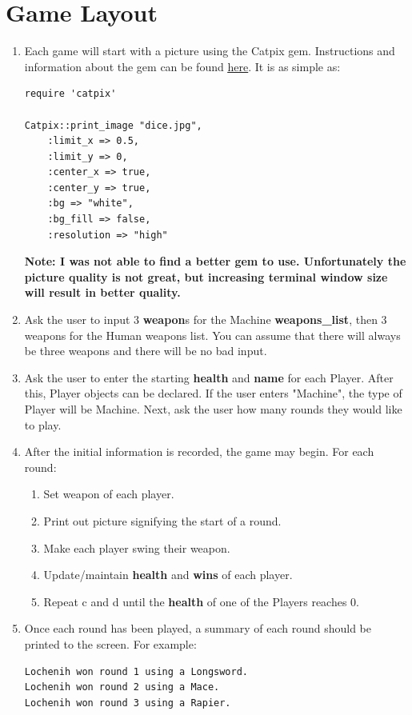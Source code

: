 \documentclass{article}
\begin{document}
\section*{Game Layout}
\begin{enumerate}

\item Each game will start with a picture using the Catpix gem. Instructions and information about the gem can be found \href{https://github.com/pazdera/catpix}{\underline{here}}. It is as simple as: \\
\begin{lstlisting}
require 'catpix'

Catpix::print_image "dice.jpg", 
	:limit_x => 0.5,
	:limit_y => 0,
	:center_x => true,
	:center_y => true,
	:bg => "white",
	:bg_fill => false,
	:resolution => "high"
\end{lstlisting}
\textbf{Note: I was not able to find a better gem to use. Unfortunately the picture quality is not great, but increasing terminal window size will result in better quality.}

\item Ask the user to input 3 \textbf{weapon}s for the Machine \textbf{weapons\_list}, then 3 weapons for the Human weapons list. You can assume that there will always be three weapons and there will be no bad input.

\item Ask the user to enter the starting \textbf{health} and \textbf{name} for each Player. After this, Player objects can be declared. If the user enters "Machine", the type of Player will be Machine. Next, ask the user how many rounds they would like to play.

\item After the initial information is recorded, the game may begin. For each round: \\
\newpage
\begin{enumerate}
\item Set weapon of each player.
\item Print out picture signifying the start of a round.
\item Make each player swing their weapon.
\item Update/maintain \textbf{health} and \textbf{wins} of each player.
\item Repeat c and d until the \textbf{health} of one of the Players reaches 0.
\end{enumerate}

\item Once each round has been played, a summary of each round should be printed to the screen. For example: \\
\begin{lstlisting}
Lochenih won round 1 using a Longsword.
Lochenih won round 2 using a Mace.
Lochenih won round 3 using a Rapier.
\end{lstlisting}


\end{enumerate}
\end{document}
